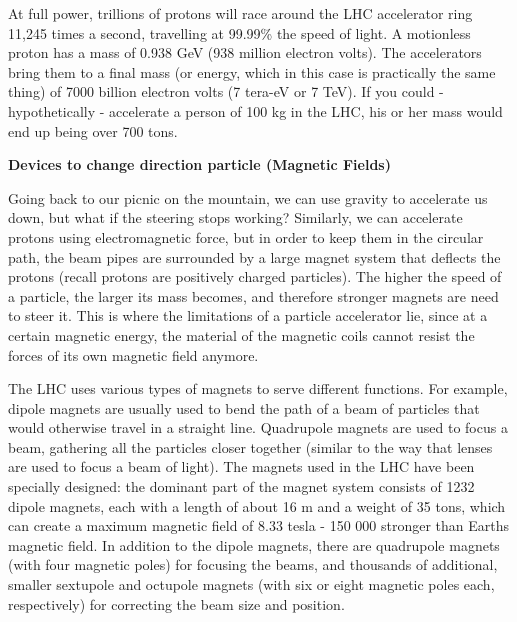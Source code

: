 \;
\noindent
At full power, trillions of protons will race around the LHC accelerator ring 11,245 times a second, travelling at 99.99\% the speed of light. A motionless proton has a mass of 0.938 GeV (938 million electron volts). The accelerators bring them to a final mass (or energy, which in this case is practically the same thing) of 7000 billion electron volts (7 tera-eV or 7 TeV). If you could - hypothetically - accelerate a person of 100 kg in the LHC, his or her mass would end up being over 700 tons.

\;
\;
\;

\noindent
\textbf{Devices to change direction particle (Magnetic Fields)}

\;
\;

\noindent
Going back to our picnic on the mountain, we can use gravity to accelerate us down, but what if the steering stops working? Similarly, we can accelerate protons using electromagnetic force, but in order to keep them in the circular path, the beam pipes are surrounded by a large magnet system that deflects the protons (recall protons are positively charged particles). The higher the speed of a particle, the larger its mass becomes, and therefore stronger magnets are need to steer it. This is where the limitations of a particle accelerator lie, since at a certain magnetic energy, the material of the magnetic coils cannot resist the forces of its own magnetic field anymore. 

\;
\noindent
The LHC uses various types of magnets to serve different functions. For example, dipole magnets are usually used to bend the path of a beam of particles that would otherwise travel in a straight line. Quadrupole magnets are used to focus a beam, gathering all the particles closer together (similar to the way that lenses are used to focus a beam of light). The magnets used in the LHC have been specially designed: the dominant part of the magnet system consists of 1232 dipole magnets, each with a length of about 16 m and a weight of 35 tons, which can create a maximum magnetic field of 8.33 tesla - 150 000 stronger than Earths magnetic field. In addition to the dipole magnets, there are quadrupole magnets (with four magnetic poles) for focusing the beams, and thousands of additional, smaller sextupole and octupole magnets (with six or eight magnetic poles each, respectively) for correcting the beam size and position. 

\;
\;


